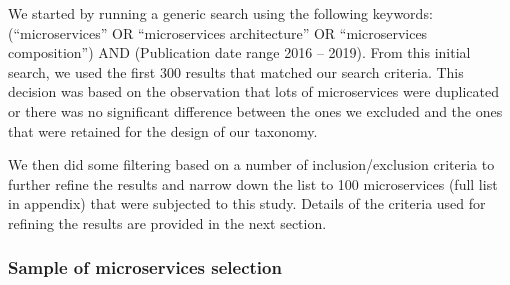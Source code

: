 \documentclass{article}
\begin{document}
We started by running a generic search using the following keywords: (“microservices” OR “microservices architecture” OR “microservices composition”) AND (Publication date range 2016 – 2019). From this initial search, we used the first 300 results that matched our search criteria. This decision was based on the observation that lots of microservices were duplicated or there was no significant difference between the ones we excluded and the ones that were retained for the design of our taxonomy.

We then did some filtering based on a number of inclusion/exclusion criteria to further refine the results and narrow down the list to 100 microservices (full list in appendix) that were subjected to this study. Details of the criteria used for refining the results are provided in the next section.

\subsubsection{Sample of microservices selection}
\end{document}
